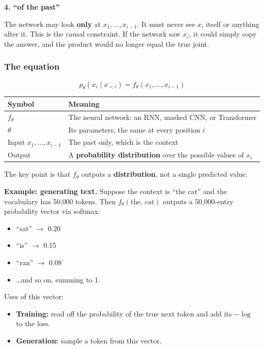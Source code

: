 \textbf{4. ``of the past''}

The network may look \textbf{only} at $x_1, \dots, x_{i-1}$. It must never see $x_i$ itself or anything after it. This is the causal constraint. If the network saw $x_i$, it could simply copy the answer, and the product would no longer equal the true joint.

\subsubsection*{The equation}

\[
p_\theta(x_i \mid x_{<i}) = f_\theta(x_1, \dots, x_{i-1})
\]

\begin{center}
\begin{tabular}{l p{11cm}}
\toprule
Symbol & Meaning \\
\midrule
$f_\theta$ & The neural network: an RNN, masked CNN, or Transformer \\
$\theta$ & Its parameters, the same at every position $i$ \\
Input $x_1, \dots, x_{i-1}$ & The past only, which is the context \\
Output & A \textbf{probability distribution} over the possible values of $x_i$ \\
\bottomrule
\end{tabular}
\end{center}

The key point is that $f_\theta$ outputs a \textbf{distribution}, not a single predicted value.

\textbf{Example: generating text.} Suppose the context is ``the cat'' and the vocabulary has 50{,}000 tokens. Then $f_\theta(\text{the, cat})$ outputs a 50{,}000-entry probability vector via softmax:
\begin{itemize}
  \item ``sat'' $\rightarrow$ 0.20
  \item ``is'' $\rightarrow$ 0.15
  \item ``ran'' $\rightarrow$ 0.08
  \item \dots and so on, summing to 1.
\end{itemize}
Uses of this vector:
\begin{itemize}
  \item \textbf{Training:} read off the probability of the true next token and add its $-\log$ to the loss.
  \item \textbf{Generation:} sample a token from this vector.
\end{itemize}

